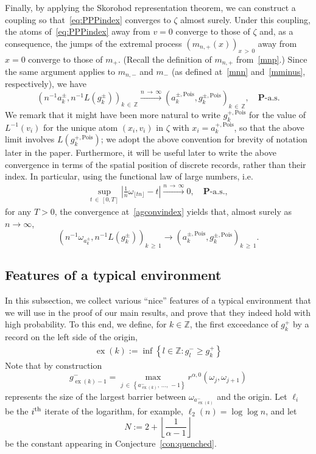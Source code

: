 \documentclass[AHL,Unicode,longabstracts,published]{cedram}
\newcommand{\Z}{\mathbb Z}
\newcommand{\bfP}{\mathbf{P}}
\newcommand{\Pois}{\text{Pois}}
\newcommand\ex{\operatorname{ex}}
\newcommand{\aat}[1]{a_{\ex(#1)}^-}
\newcommand{\gtt}[1]{g_{\ex(#1)-1}^-}
\begin{document}
Finally, by applying the Skorohod representation theorem, we can construct a coupling so that~\eqref{eq:PPPindex} converges to $\zeta$ almost surely. Under this coupling, the atoms of~\eqref{eq:PPPindex} away from $v=0$ converge to those of $\zeta$ and, as a consequence, the jumps of the extremal process $(m_{n,+}(x))_{x\,>\,0}$ away from $x=0$ converge to those of $m_+$. (Recall the definition of $m_{n,+}$ from~\eqref{mnp}.) Since the same argument applies to $m_{n,-}$ and $m_-$ (as defined at~\eqref{mnn} and~\eqref{mminus}, respectively), we have
\begin{equation}\label{agconvindex}
\left(n^{-1}{a_k^\pm},n^{-1}L\left(g_k^\pm\right)\right)_{k\,\in\,\Z}\xrightarrow{n\,\to\,\infty} \left(a_k^{\pm,\Pois},g_k^{\pm,\Pois}\right)_{k\,\in\,\Z},\quad\bfP\text{-a.s.}
\end{equation}
We remark that it might have been more natural to write $g_k^{+,\Pois}$ for the value of $L^{-1}(v_i)$ for the unique atom $(x_i,v_i)$ in $\zeta$ with $x_i=a_k^{+,\Pois}$, so that the above limit involves $L(g_k^{+,\Pois})$; we adopt the above convention for brevity of notation later in the paper. Furthermore, it will be useful later to write the above convergence in terms of the spatial position of discrete records, rather than their index. In particular, using the functional law of large numbers, i.e.\
\begin{align*}
\sup_{t\,\in\,[0,T]}\left|\tfrac{1}{n}\omega_{\lfloor tn\rfloor}-t\right|\xrightarrow{n\,\to\,\infty} 0,\quad \bfP\text{-a.s.},
\end{align*}
for any $T>0$, the convergence at~\eqref{agconvindex} yields that, almost surely as $n\to\infty$,
\begin{equation}\label{agconv}
\left(n^{-1}\omega_{a_k^\pm},n^{-1}L\left(g_k^\pm\right)\right)_{k\,\geq\,1}\rightarrow \left(a_k^{\pm,\Pois},g_k^{\pm,\Pois}\right)_{k\,\geq\,1}.
\end{equation}

\subsection{Features of a typical environment}\label{22}

In this subsection, we collect various ``nice'' features of a typical environment that we will use in the proof of our main results, and prove that they indeed hold with high probability. To this end, we define, for $k\in\Z$, the first exceedance of $g_k^+$ by a record on the left side of the origin,
\begin{align}\label{eq:def_ex}
\ex(k):=\inf\left\{l\in\Z:g^-_l\geq g^+_k\right\}
\end{align}
Note that by construction
\[
\gtt{k}=\max_{j\,\in\,\left\{\aat{k},\,\dots,\,-1\right\}}r^{\alpha,0}\left(\omega_j,\omega_{j+1}\right)
\]
represents the size of the largest barrier between $\omega_{\aat{k}}$ and the origin. Let $\ell_i$ be the $i^{\rm th}$ iterate of the logarithm, for example, $\ell_2(n)=\log\log n$, and let
\[
N:=2+\left\lfloor\frac{1}{\alpha-1}\right\rfloor
\]
be the constant appearing in Conjecture~\ref{con:quenched}.
\end{document}
